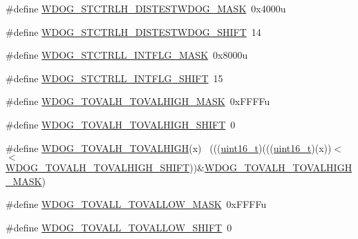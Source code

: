 \begin{DoxyCompactItemize}
\item 
\#define \hyperlink{group___w_d_o_g___register___masks_gadc235bcbd7644d445d3ca5cb682cdc57}{W\+D\+O\+G\+\_\+\+S\+T\+C\+T\+R\+L\+H\+\_\+\+D\+I\+S\+T\+E\+S\+T\+W\+D\+O\+G\+\_\+\+M\+A\+SK}~0x4000u
\item 
\#define \hyperlink{group___w_d_o_g___register___masks_gabc176648bbc119e959823d20c38d3ece}{W\+D\+O\+G\+\_\+\+S\+T\+C\+T\+R\+L\+H\+\_\+\+D\+I\+S\+T\+E\+S\+T\+W\+D\+O\+G\+\_\+\+S\+H\+I\+FT}~14
\item 
\#define \hyperlink{group___w_d_o_g___register___masks_ga28985249246b9ad12b7f4e50d5d1ee46}{W\+D\+O\+G\+\_\+\+S\+T\+C\+T\+R\+L\+L\+\_\+\+I\+N\+T\+F\+L\+G\+\_\+\+M\+A\+SK}~0x8000u
\item 
\#define \hyperlink{group___w_d_o_g___register___masks_ga672e303cca0aaea64e48b5e632a2e666}{W\+D\+O\+G\+\_\+\+S\+T\+C\+T\+R\+L\+L\+\_\+\+I\+N\+T\+F\+L\+G\+\_\+\+S\+H\+I\+FT}~15
\item 
\#define \hyperlink{group___w_d_o_g___register___masks_ga3b934300a204f2b11fefc7961dc25f55}{W\+D\+O\+G\+\_\+\+T\+O\+V\+A\+L\+H\+\_\+\+T\+O\+V\+A\+L\+H\+I\+G\+H\+\_\+\+M\+A\+SK}~0x\+F\+F\+F\+Fu
\item 
\#define \hyperlink{group___w_d_o_g___register___masks_ga6729532c2b047c0d3327ffcf7357825c}{W\+D\+O\+G\+\_\+\+T\+O\+V\+A\+L\+H\+\_\+\+T\+O\+V\+A\+L\+H\+I\+G\+H\+\_\+\+S\+H\+I\+FT}~0
\item 
\#define \hyperlink{group___w_d_o_g___register___masks_ga186f8f5792b34501fe75c6303c530e17}{W\+D\+O\+G\+\_\+\+T\+O\+V\+A\+L\+H\+\_\+\+T\+O\+V\+A\+L\+H\+I\+GH}(x)                              ~(((\hyperlink{_p_e___types_8h_a1f1825b69244eb3ad2c7165ddc99c956}{uint16\+\_\+t})(((\hyperlink{_p_e___types_8h_a1f1825b69244eb3ad2c7165ddc99c956}{uint16\+\_\+t})(x))$<$$<$\hyperlink{group___w_d_o_g___register___masks_ga6729532c2b047c0d3327ffcf7357825c}{W\+D\+O\+G\+\_\+\+T\+O\+V\+A\+L\+H\+\_\+\+T\+O\+V\+A\+L\+H\+I\+G\+H\+\_\+\+S\+H\+I\+FT}))\&\hyperlink{group___w_d_o_g___register___masks_ga3b934300a204f2b11fefc7961dc25f55}{W\+D\+O\+G\+\_\+\+T\+O\+V\+A\+L\+H\+\_\+\+T\+O\+V\+A\+L\+H\+I\+G\+H\+\_\+\+M\+A\+SK})
\item 
\#define \hyperlink{group___w_d_o_g___register___masks_ga71c3913b6be99b211a3c3031caf8ac66}{W\+D\+O\+G\+\_\+\+T\+O\+V\+A\+L\+L\+\_\+\+T\+O\+V\+A\+L\+L\+O\+W\+\_\+\+M\+A\+SK}~0x\+F\+F\+F\+Fu
\item 
\#define \hyperlink{group___w_d_o_g___register___masks_ga57ba2617b2855cd4b3d1eb0b3c878f52}{W\+D\+O\+G\+\_\+\+T\+O\+V\+A\+L\+L\+\_\+\+T\+O\+V\+A\+L\+L\+O\+W\+\_\+\+S\+H\+I\+FT}~0
$$
\end{DoxyCompactItemize}
